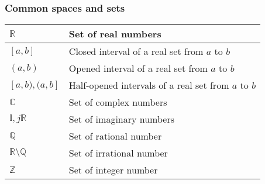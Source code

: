 \subsubsection{Common spaces and sets}
\begin{xltabular}{\textwidth}{XX}
	\(\mathbb{R}\)                                             & Set of real numbers                                                                                                                                \\ \hline
	\([a, b]\)                                                 & Closed interval of a real set from \(a\) to \(b\)                                                                                                  \\ \hline
	\((a, b)\)                                                 & Opened interval of a real set from \(a\) to \(b\)                                                                                                  \\ \hline
	\([a, b), (a, b]\)                                         & Half-opened intervals of a real set from \(a\) to \(b\)                                                                                            \\ \hline
	\(\mathbb{C}\)                                             & Set of complex numbers                                                                                                                             \\ \hline
	\(\mathbb{I}, j\mathbb{R}\)                                & Set of imaginary numbers                                                                                                                             \\ \hline
	\(\mathbb{Q}\)                                             & Set of rational number                                                                                                                              \\ \hline
	\(\mathbb{R} \setminus \mathbb{Q}\)                        & Set of irrational number                                                                                                                              \\ \hline
	\(\mathbb{Z}\)                                             & Set of integer number                                                                                                                              \\ \hline

\end{xltabular}
